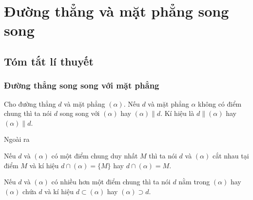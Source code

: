 \section{Đường thẳng và mặt phẳng song song}
\subsection{Tóm tắt lí thuyết}
\subsubsection{Đường thẳng song song với mặt phẳng}

\begin{dn}
    Cho đường thẳng $d$ và mặt phẳng $(\alpha)$. Nếu $d$ và mặt phẳng $\alpha$ không có điểm chung thì ta nói $d$ song song với $(\alpha)$ hay $(\alpha) \parallel d$. Kí hiệu là $d \parallel (\alpha)$ hay $(\alpha)\parallel d$.
\end{dn}
Ngoài ra
\begin{listEX}[1]
    \item  Nếu $d$ và $(\alpha)$ có một điểm chung duy nhất $M$ thì ta nói $d$ và $(\alpha)$ cắt nhau tại điểm $M$ và kí hiệu $d \cap(\alpha)=\{M\}$ hay $d \cap(\alpha)=M$.
    \item Nếu $d$ và $(\alpha)$ có nhiều hơn một điểm chung thì ta nói $d$ nằm trong $(\alpha)$ hay $(\alpha)$ chứa $d$ và kí hiệu $d \subset(\alpha)$ hay $(\alpha) \supset d$.
\end{listEX}
